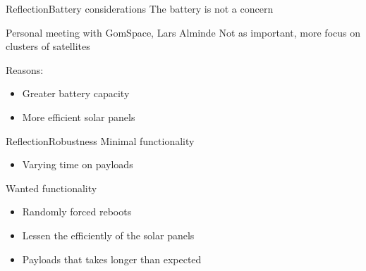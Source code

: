 \begin{frame}{Reflection}{Battery considerations}
	The battery is not a concern
	\begin{block}{Personal meeting with GomSpace, Lars Alminde}
		Not as important, more focus on clusters of satellites
	\end{block}
	Reasons:
	\begin{itemize}
		\item Greater battery capacity
		\item More efficient solar panels
	\end{itemize}
\end{frame}

\begin{frame}{Reflection}{Robustness}
	Minimal functionality
	\begin{itemize}
		\item Varying time on payloads
	\end{itemize}
	Wanted functionality
	\begin{itemize}
		\item Randomly forced reboots
		\item Lessen the efficiently of the solar panels
		\item Payloads that takes longer than expected
	\end{itemize}
\end{frame}
